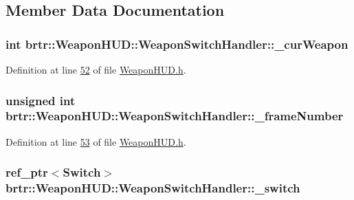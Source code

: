 \subsection{Member Data Documentation}
\hypertarget{classbrtr_1_1_weapon_h_u_d_1_1_weapon_switch_handler_a15b23d25cb1847f558493adc2a97311e}{
\subsubsection[{\+\_\+cur\+Weapon}]{\setlength{\rightskip}{0pt plus 5cm}int brtr\+::\+Weapon\+H\+U\+D\+::\+Weapon\+Switch\+Handler\+::\+\_\+cur\+Weapon\hspace{0.3cm}{\ttfamily [private]}}}\label{classbrtr_1_1_weapon_h_u_d_1_1_weapon_switch_handler_a15b23d25cb1847f558493adc2a97311e}


Definition at line \hyperlink{_weapon_h_u_d_8h_source_l00052}{52} of file \hyperlink{_weapon_h_u_d_8h_source}{Weapon\+H\+U\+D.\+h}.

\hypertarget{classbrtr_1_1_weapon_h_u_d_1_1_weapon_switch_handler_abfa6e6c2904d1e6ed7cd5d029a632ddf}{
\subsubsection[{\+\_\+frame\+Number}]{\setlength{\rightskip}{0pt plus 5cm}unsigned int brtr\+::\+Weapon\+H\+U\+D\+::\+Weapon\+Switch\+Handler\+::\+\_\+frame\+Number\hspace{0.3cm}{\ttfamily [private]}}}\label{classbrtr_1_1_weapon_h_u_d_1_1_weapon_switch_handler_abfa6e6c2904d1e6ed7cd5d029a632ddf}


Definition at line \hyperlink{_weapon_h_u_d_8h_source_l00053}{53} of file \hyperlink{_weapon_h_u_d_8h_source}{Weapon\+H\+U\+D.\+h}.

\hypertarget{classbrtr_1_1_weapon_h_u_d_1_1_weapon_switch_handler_af4b40e431f9cbcaddf843578316bb9c4}{
\subsubsection[{\+\_\+switch}]{\setlength{\rightskip}{0pt plus 5cm}ref\+\_\+ptr$<$Switch$>$ brtr\+::\+Weapon\+H\+U\+D\+::\+Weapon\+Switch\+Handler\+::\+\_\+switch\hspace{0.3cm}{\ttfamily [private]}}}\label{classbrtr_1_1_weapon_h_u_d_1_1_weapon_switch_handler_af4b40e431f9cbcaddf843578316bb9c4}


